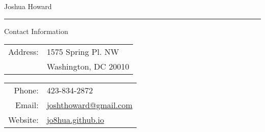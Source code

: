 \documentclass[]{article}
\def\bar{\hrule}
\begin{document}
\par{\centering
        {\Huge Joshua Howard
}\par} 
\vspace{.3cm}
\bar
\vspace{.3cm}
{\large Contact Information \par} 
\vspace{.3cm}
\begin{tabular}{rl}
    Address:   & 1575 Spring Pl. NW \\  &  Washington, DC 20010 
\end{tabular}
\begin{tabular}{rl}
    Phone: & 423-834-2872\\
    Email: & \href{mailto:joshthoward@gmail.com}{joshthoward@gmail.com} \\
    Website: & \href{http://jo8hua.github.io}{jo8hua.github.io}
\end{tabular} 
\end{document}
